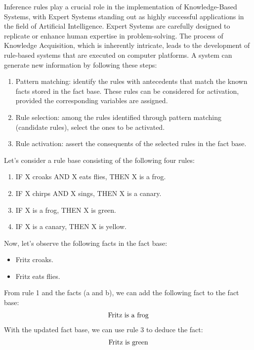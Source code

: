 \documentclass[12pt, a4paper]{report}
\begin{document}
    Inference rules play a crucial role in the implementation of Knowledge-Based Systems, with Expert Systems standing out as highly successful applications in the field of Artificial Intelligence. 
    Expert Systems are carefully designed to replicate or enhance human expertise in problem-solving. 
    The process of Knowledge Acquisition, which is inherently intricate, leads to the development of rule-based systems that are executed on computer platforms.
    A system can generate new information by following these steps:
    \begin{enumerate}
        \item Pattern matching: identify the rules with antecedents that match the known facts stored in the fact base. 
            These rules can be considered for activation, provided the corresponding variables are assigned.
        \item Rule selection: among the rules identified through pattern matching (candidate rules), select the ones to be activated.
        \item Rule activation: assert the consequents of the selected rules in the fact base.
    \end{enumerate}
    \begin{example}
        Let's consider a rule base consisting of the following four rules:
        \begin{enumerate}
            \item IF X croaks AND X eats flies, THEN X is a frog.
            \item IF X chirps AND X sings, THEN X is a canary.
            \item IF X is a frog, THEN X is green.
            \item IF X is a canary, THEN X is yellow.
        \end{enumerate}
        Now, let's observe the following facts in the fact base:
        \begin{itemize}
            \item Fritz croaks.
            \item Fritz eats flies.
        \end{itemize}
        From rule 1 and the facts (a and b), we can add the following fact to the fact base:
        \[\textnormal{Fritz is a frog}\]
        With the updated fact base, we can use rule 3 to deduce the fact:
        \[\textnormal{Fritz is green}\]
    \end{example}
\end{document}
